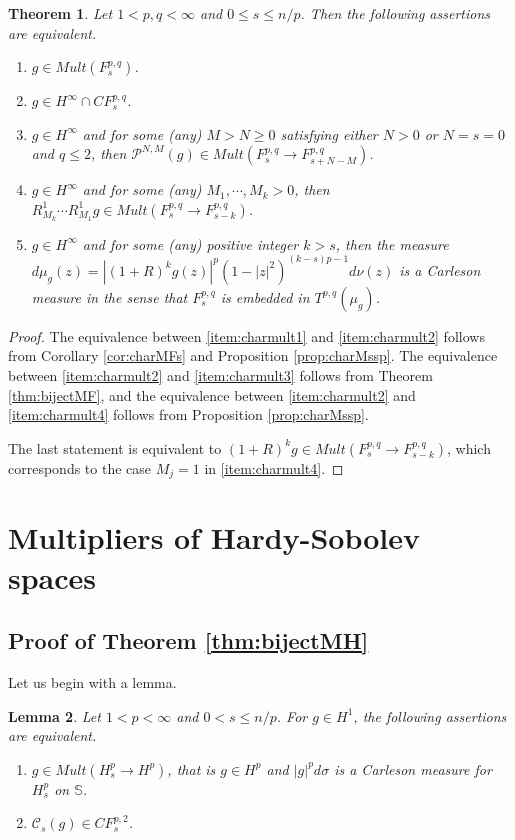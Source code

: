 \documentclass[12pt,twoside,leqno,final]{amsart}
\theoremstyle{plain}
\newtheorem{thm}{Theorem}[section]
\newtheorem{lem}[thm]{Lemma}
\begin{document}
\begin{thm} \label{thm:charmult}
Let $1<p,q<\infty$ and $0\le s\le n/p$. Then the following assertions are equivalent.

\begin{enumerate}
	\item\label{item:charmult1} $g\in Mult(F^{p,q}_s)$. 
	\item\label{item:charmult2}  $g\in H^\infty\cap CF^{p,q}_s$.
	\item\label{item:charmult3}  $g\in H^\infty$ and for some (any) $M>N\ge 0$ satisfying either 
	$N>0$ or $N=s= 0$ and $q\le 2$, then ${{\mathcal P}}^{N,M}(g)\in Mult(F^{p,q}_s\to F^{p,q}_{s+N-M})$.
	\item \label{item:charmult4} $g\in H^\infty$ and for some (any) $M_1,\cdots, M_k>0$, then 
	$R^1_{M_k}\cdots R^1_{M_1}g\in Mult(F^{p,q}_s\to F^{p,q}_{s-k})$. 
	\item \label{item:charmult5} $g\in H^\infty$ and for some (any) positive integer $k>s$, then the measure $d\mu_g(z)=|(1+R)^kg(z)|^p(1-|z|^2)^{(k-s)p-1}d\nu(z)$ is a Carleson measure in the sense that  $F_s^{p,q}$ is embedded in $T^{p,q}( \mu_g)$.
\end{enumerate}
\end{thm}

\begin{proof} The equivalence between \eqref{item:charmult1} and \eqref{item:charmult2} follows 
from Corollary \ref{cor:charMFs} and Proposition \ref{prop:charMssp}. 
The equivalence between \eqref{item:charmult2} and \eqref{item:charmult3} follows 
from  Theorem \ref{thm:bijectMF}, and the equivalence between 
\eqref{item:charmult2} and \eqref{item:charmult4} follows from Proposition \ref{prop:charMssp}.

The last statement is equivalent to $(1+R)^k g\in Mult(F^{p,q}_s\to F^{p,q}_{s-k})$, which corresponds to the case $M_j=1$ in \eqref{item:charmult4}.
\end{proof}

\section{Multipliers of Hardy-Sobolev spaces}\label{sec:multHS}
 \subsection{Proof of Theorem \ref{thm:bijectMH}} Let us begin with a lemma.

\begin{lem} \label{prop:CsM}
Let $1<p<\infty$ and $0<s\le n/p$. 
For $g\in H^1$, the following assertions are equivalent.

\begin{enumerate}
	\item $g\in Mult(H^p_s\to H^p)$, that is $g\in H^p$ and $|g|^p d\sigma$ is a Carleson measure for $H^p_s$ on ${{\mathbb S}}$.
	\item $\mathcal{C}_s(g)\in CF^{p,2}_s$.
\end{enumerate}
\end{lem}
\end{document}
